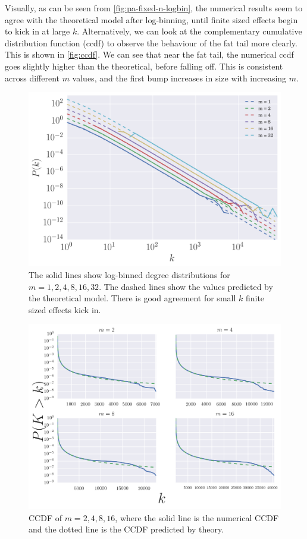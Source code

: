 Visually, as can be seen from \autoref{fig:pa-fixed-n-logbin}, the numerical results seem to agree with the theoretical model after log-binning, until finite sized effects begin to kick in at large $k$. Alternatively, we can look at the complementary cumulative distribution function (ccdf) to observe the behaviour of the fat tail more clearly. This is shown in \autoref{fig:ccdf}. We can see that near the fat tail, the numerical ccdf goes slightly higher than the theoretical, before falling off. This is consistent across different $m$ values, and the first bump increases in size with increasing $m$. 

\begin{figure}
    \centering
    \includegraphics[height=0.5\linewidth]{img/pa-fixed-n-logbin}
    \caption{The solid lines show log-binned degree distributions for $m = 1, 2, 4, 8, 16, 32$. The dashed lines show the values predicted by the theoretical model. There is good agreement for small $k$ finite sized effects kick in. }
    \label{fig:pa-fixed-n-logbin}
\end{figure}

\begin{figure}
    \centering
    \includegraphics[height=0.7\linewidth]{img/ccdf}
    \caption{CCDF of $m=2, 4, 8, 16$, where the solid line is the numerical CCDF and the dotted line is the CCDF predicted by theory.}
    \label{fig:ccdf}
\end{figure}

